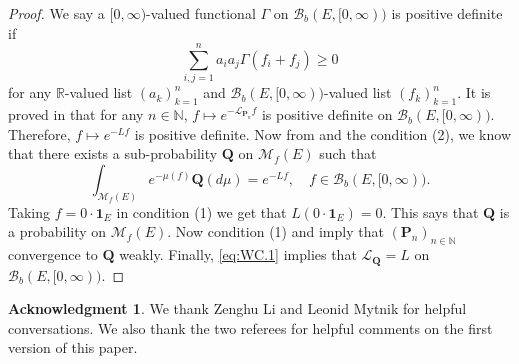 \documentclass[12pt,a4paper]{amsart}
\numberwithin{equation}{section}
\theoremstyle{plain}
\theoremstyle{definition}
\newtheorem*{acknowledgment*}{Acknowledgment}
\theoremstyle{remark}
\begin{document}
\begin{proof}
	We say a $[0,\infty)$-valued functional $\Gamma$ on $\mathcal B_b(E,[0,\infty))$ is positive definite if
\[
	\sum_{i,j =1}^n a_i a_j \Gamma (f_i + f_j)\geq 0
\]
for any $\mathbb R$-valued list $(a_k)_{k = 1}^n$ and $\mathcal B_b(E,[0,\infty))$-valued list $(f_k)_{k = 1}^n$.
	It is proved in \cite[Theorem 3.3.3]{Dawson1992Infinitely} that for any $n \in \mathbb N$, $f\mapsto e^{- \mathscr L_{\mathbf P_n}f}$ is positive definite on $\mathcal B_b(E,[0,\infty))$.
	Therefore, $f \mapsto e^{- L f}$ is positive definite.
	Now from \cite[Corollary (A.6)]{Fitzsimmons1989Construction} and the condition (2), we know that there exists a sub-probability $\mathbf Q$ on $\mathcal M_f(E)$ such that
\begin{equation}	\label{eq:WC.1}
	\int_{\mathcal M_f(E)}e^{-\mu(f) } \mathbf Q(d\mu) = e^{-Lf}, \quad f \in \mathcal B_b(E,[0,\infty)).
\end{equation}
	Taking $f = 0 \cdot \mathbf 1_E$ in condition (1) we get that $L(0\cdot \mathbf 1_E) = 0$.
	This says that $\mathbf Q$ is a probability on $\mathcal M_f(E)$.
	Now condition (1) and \cite[Theorem 1.8]{Li2011MeasureValued} imply that $(\mathbf P_n)_{n \in \mathbb N}$ convergence to $\mathbf Q$ weakly.
	Finally, \eqref{eq:WC.1} implies that $\mathscr L_{\mathbf Q} = L$ on $\mathcal B_b(E,[0,\infty))$.
\end{proof}

\begin{acknowledgment*}
	We thank Zenghu Li and Leonid Mytnik for helpful conversations.
	We also thank the two referees for helpful comments on the first version of this paper.
\end{acknowledgment*}
\end{document}
